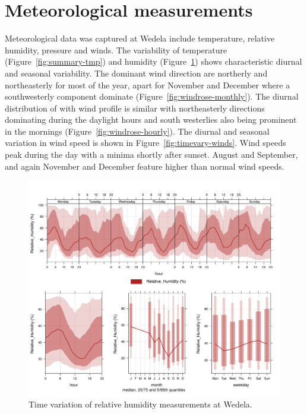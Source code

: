 \documentclass{nwureport}
\begin{document}
\section{Meteorological measurements}

Meteorological data was captured at Wedela include temperature, relative humidity, pressure and winds. The variability of temperature (Figure~\ref{fig:summary-tmp}) and humidity (Figure~\ref{fig:summary-rh}) shows characteristic diurnal and seasonal variability. The dominant wind direction are northerly and northeasterly for most of the year, apart for November and December where a southwesterly component dominate (Figure~\ref{fig:windrose-monthly}). The diurnal distribution of with wind profile is similar with northeasterly directions dominating during the daylight hours and south westerlies also being prominent in the mornings (Figure~\ref{fig:windrose-hourly}). The diurnal and seasonal variation in wind speed is shown in Figure~\ref{fig:timevary-winds}. Wind speeds peak during the day with a minima shortly after sunset. August and September, and again November and December feature higher than normal wind speeds.

\begin{figure}[!htb]
    \centering
    \includegraphics[width=\textwidth]{images/Wedela_Relative_Humidity_timevary.png}
    \caption[Time variation of relative humidity measurements at Wedela.]{Time variation of relative humidity measurements at Wedela.}
    \label{fig:summary-rh}
\end{figure}
\end{document}
